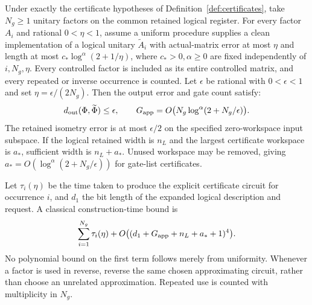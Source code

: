 \begin{theorem}
\label{eqv:approx}
Under exactly the certificate hypotheses of
Definition~\ref{def:certificates}, take $N_g\geq1$ unitary factors on the
common retained logical register. For every factor $A_i$ and rational
$0<\eta<1$, assume a uniform procedure supplies a clean implementation
of a logical unitary $\widetilde A_i$ with actual-matrix error at most
$\eta$ and length at most $c_*\log^\alpha(2+1/\eta)$, where
$c_*>0,\alpha\geq0$ are fixed independently of $i,N_g,\eta$. Every controlled
factor is included as its entire controlled matrix, and every repeated
or inverse occurrence is counted. Let $\epsilon$ be rational with
$0<\epsilon<1$ and set $\eta=\epsilon/(2N_g)$. Then the output error and gate count satisfy:
\[
 d_{\rm out}(\Phi,\widetilde\Phi)\leq\epsilon,
 \qquad G_{\rm app}=O\bigl(N_g\log^\alpha(2+N_g/\epsilon)\bigr).
\]
The retained isometry error is at most $\epsilon/2$ on the specified
zero-workspace input subspace. If the logical retained width is $n_L$
and the largest certificate workspace is $a_*$, sufficient width is
$n_L+a_*$. Unused workspace may be removed, giving
$a_*=O(\log^\alpha(2+N_g/\epsilon))$ for gate-list certificates.

Let $\tau_i(\eta)$ be the time taken to produce the explicit certificate
circuit for occurrence $i$, and $d_1$ the bit length of the expanded
logical description and request. A classical construction-time bound is
\[
 \sum_{i=1}^{N_g}\tau_i(\eta)
   +O\bigl((d_1+G_{\rm app}+n_L+a_*+1)^4\bigr).
\]
No polynomial bound on the first term follows merely from uniformity.
Whenever a factor is used in reverse, reverse the same chosen
approximating circuit, rather than choose an unrelated approximation.
Repeated use is counted with multiplicity in $N_g$.
\end{theorem}

